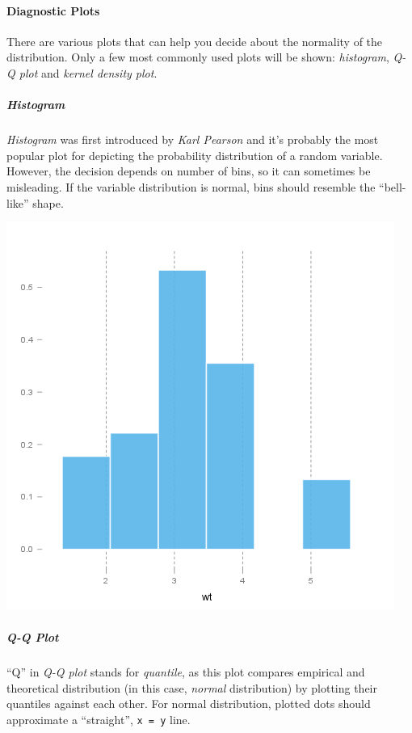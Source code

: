 \documentclass[]{article}
\makeatletter
\def\maxwidth{\ifdim\Gin@nat@width>\linewidth\linewidth
\else\Gin@nat@width\fi}
\let\Oldincludegraphics\includegraphics
\renewcommand{\includegraphics}[1]{\Oldincludegraphics[width=\maxwidth]{#1}}
\makeatother
\begin{document}
\paragraph{Diagnostic Plots}

There are various plots that can help you decide about the normality of
the distribution. Only a few most commonly used plots will be shown:
\emph{histogram}, \emph{Q-Q plot} and \emph{kernel density plot}.

\subparagraph{Histogram}

\emph{Histogram} was first introduced by \emph{Karl Pearson} and it's
probably the most popular plot for depicting the probability
distribution of a random variable. However, the decision depends on
number of bins, so it can sometimes be misleading. If the variable
distribution is normal, bins should resemble the ``bell-like'' shape.

\href{/tmp/RtmpeIwHkw/file222d547b-hires.png}{\includegraphics{bf47295875cfa6d1667455a7d2721b19.png}}

\subparagraph{Q-Q Plot}

``Q'' in \emph{Q-Q plot} stands for \emph{quantile}, as this plot
compares empirical and theoretical distribution (in this case,
\emph{normal} distribution) by plotting their quantiles against each
other. For normal distribution, plotted dots should approximate a
``straight'', \texttt{x = y} line.
\end{document}
